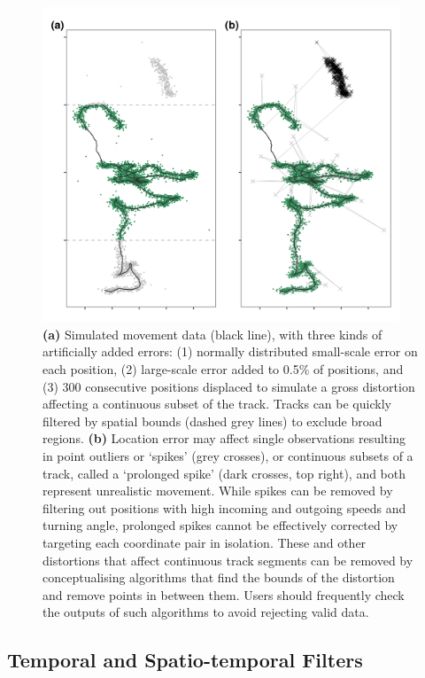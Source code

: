 \documentclass[10pt,paper=a4,headings=standardclasses
]{scrartcl}
\begin{document}
\begin{figure}[h!]
    \centering
    \includegraphics[width=0.95\textwidth]{figures/fig_02_filtering_data.png}
    \caption{\textbf{(a)} Simulated movement data (black line), with three kinds of artificially added errors: (1) normally distributed small-scale error on each position, (2) large-scale error added to 0.5\% of positions, and (3) 300 consecutive positions displaced to simulate a gross distortion affecting a continuous subset of the track.  
    Tracks can be quickly filtered by spatial bounds (dashed grey lines) to exclude broad regions.
    \textbf{(b)} 
    Location error may affect single observations resulting in point outliers or `spikes' (grey crosses), or continuous subsets of a track, called a `prolonged spike' (dark crosses, top right), and both represent unrealistic movement.
    While spikes can be removed by filtering out positions with high incoming and outgoing speeds and turning angle, prolonged spikes cannot be effectively corrected by targeting each coordinate pair in isolation.
    These and other distortions that affect continuous track segments can be removed by conceptualising algorithms that find the bounds of the distortion and remove points in between them.
    Users should frequently check the outputs of such algorithms to avoid rejecting valid data.
    }
    \label{fig:figure_filtering_data}
\end{figure}

\subsection{Temporal and Spatio-temporal Filters}
\end{document}
